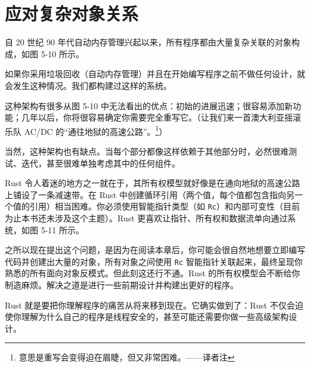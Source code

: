 \section{应对复杂对象关系}

自 20 世纪 90 年代自动内存管理兴起以来，所有程序都由大量复杂关联的对象构成，如图 5-10 所示。


如果你采用垃圾回收（自动内存管理）并且在开始编写程序之前不做任何设计，就会发生这种情况。我们都构建过这样的系统。

这种架构有很多从图 5-10 中无法看出的优点：初始的进展迅速；很容易添加新功能；几年以后，你将很容易确定你需要完全重写它。（让我们来一首澳大利亚摇滚乐队 AC/DC 的“通往地狱的高速公路”。\footnote{意思是重写会变得迫在眉睫，但又非常困难。——译者注}）

当然，这种架构也有缺点。当每个部分都像这样依赖于其他部分时，必然很难测试、迭代，甚至很难单独考虑其中的任何组件。

Rust 令人着迷的地方之一就在于，其所有权模型就好像是在通向地狱的高速公路上铺设了一条减速带。在 Rust 中创建循环引用（两个值，每个值都包含指向另一个值的引用）相当困难。你必须使用智能指针类型（如 \texttt{Rc}）和内部可变性（目前为止本书还未涉及这个主题）。Rust 更喜欢让指针、所有权和数据流单向通过系统，如图 5-11 所示。


之所以现在提出这个问题，是因为在阅读本章后，你可能会很自然地想要立即编写代码并创建出大量的对象，所有对象之间使用 \texttt{Rc} 智能指针关联起来，最终呈现你熟悉的所有面向对象反模式。但此刻这还行不通。Rust 的所有权模型会不断给你制造麻烦。解决之道是进行一些前期设计并构建出更好的程序。

Rust 就是要把你理解程序的痛苦从将来移到现在。它确实做到了：Rust 不仅会迫使你理解为什么自己的程序是线程安全的，甚至可能还需要你做一些高级架构设计。

